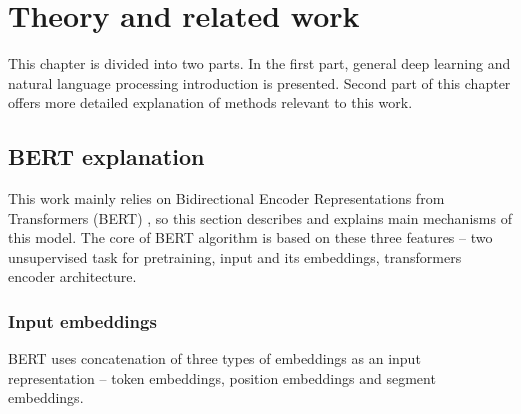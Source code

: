 \chapter{Theory and related work}
\label{chap:theandme}
This chapter is divided into two parts. In the first part, general deep learning and natural language processing introduction is presented. Second part of this chapter offers more detailed explanation of methods relevant to this work.



\section{BERT explanation}
This work mainly relies on Bidirectional Encoder Representations from Transformers (BERT)%
, so this section describes and explains main mechanisms of this model. 
The core of BERT algorithm is based on these three features -- two unsupervised task for pretraining, input and its embeddings, transformers encoder %
architecture.

\subsection{Input embeddings}
BERT uses concatenation of three types of embeddings as an input representation -- token embeddings, position embeddings and segment embeddings. %

